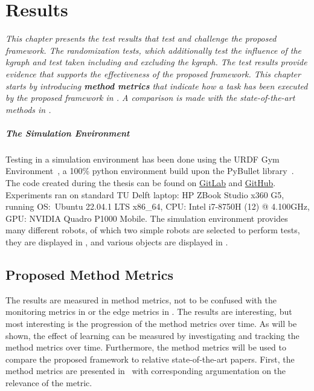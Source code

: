 \chapter{Results}%
\label{chap:results}
\textit{This chapter presents the test results that test and challenge the proposed framework.  The randomization tests, which additionally test the influence of the \ac{kgraph} and test taken including and excluding the \ac{kgraph}. The test results provide evidence that supports the effectiveness of the proposed framework. This chapter starts by introducing \textbf{method metrics} that indicate how a task has been executed by the proposed framework in . A comparison is made with the state-of-the-art methods in . \bs}

\paragraph{The Simulation Environment}
Testing in a simulation environment has been done using the URDF Gym Environment~\cite{spahn_urdfenvironment_2022}, a 100\% python environment build upon the PyBullet library~\cite{coumans_pybullet_2016}. The code created during the thesis can be found on \href{https://gitlab.tudelft.nl/airlab-delft/msc_projects/msc_gijs_groote}{GitLab} and \href{https://github.com/GijsGroote/semantic-thinking-robot}{GitHub}. Experiments ran on standard TU Delft laptop: HP ZBook Studio x360 G5, running OS:~Ubuntu 22.04.1 LTS x86\_64, CPU: Intel i7-8750H (12) @ 4.100GHz, GPU: NVIDIA Quadro P1000 Mobile.\bs
The simulation environment provides many different robots, of which two simple robots are selected to perform tests, they are displayed in , and various objects are displayed in .

\section{Proposed Method Metrics}%
\label{sec:proposed_method_metrics}
The results are measured in method metrics, not to be confused with the monitoring metrics in  or the edge metrics in . The results are interesting, but most interesting is the progression of the method metrics over time. As will be shown, the effect of learning can be measured by investigating and tracking the method metrics over time. Furthermore, the method metrics will be used to compare the proposed framework to relative state-of-the-art papers. First, the method metrics are presented in~ with corresponding argumentation on the relevance of the metric.\bs

